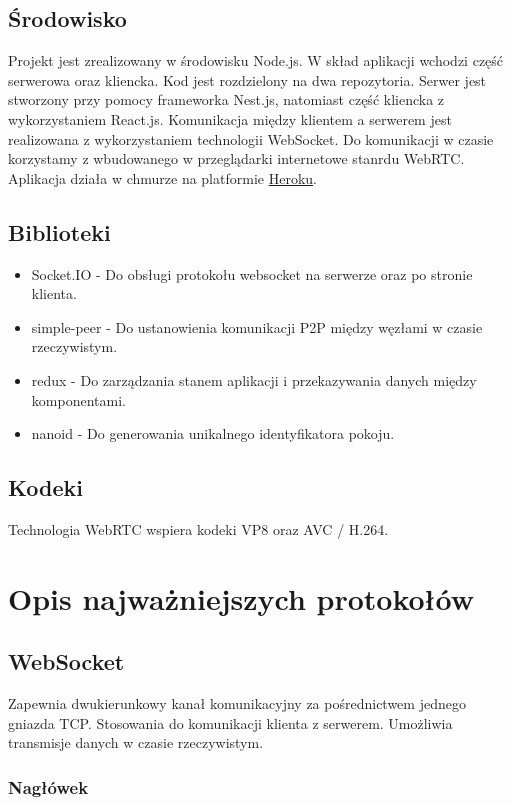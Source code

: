 \documentclass{article}
\begin{document}
\subsection{Środowisko}
Projekt jest zrealizowany w środowisku Node.js. W skład aplikacji wchodzi część serwerowa oraz kliencka. Kod jest rozdzielony na dwa repozytoria. Serwer jest stworzony przy pomocy frameworka Nest.js, natomiast część kliencka z wykorzystaniem React.js. Komunikacja między klientem a serwerem jest realizowana z wykorzystaniem technologii WebSocket. Do komunikacji w czasie korzystamy z wbudowanego w przeglądarki internetowe stanrdu WebRTC. Aplikacja działa w chmurze na platformie \href{https://dashboard.heroku.com/apps}{Heroku}.

\subsection{Biblioteki}

\begin{itemize}
\item Socket.IO - Do obsługi protokołu websocket na serwerze oraz po stronie klienta.
\item simple-peer - Do ustanowienia komunikacji P2P między węzłami w czasie rzeczywistym.
\item redux - Do zarządzania stanem aplikacji i przekazywania danych między komponentami.
\item nanoid - Do generowania unikalnego identyfikatora pokoju.
\end{itemize}

\subsection{Kodeki}
Technologia WebRTC wspiera kodeki VP8 oraz AVC / H.264.

\section{Opis najważniejszych protokołów}

\subsection{WebSocket}
Zapewnia dwukierunkowy kanał komunikacyjny za pośrednictwem jednego gniazda TCP. Stosowania do komunikacji klienta z serwerem. Umożliwia transmisje danych w czasie rzeczywistym.

\subsubsection{Nagłówek}
\end{document}
